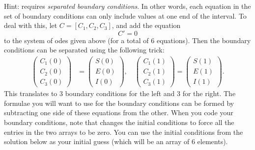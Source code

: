 \begin{problem}
Hint:  requires \emph{separated boundary conditions}.
In other words, each equation in the set of boundary conditions can only include values at one end of the interval.
To deal with this, let $C = [C_1, C_2, C_3]$, and add the equation
\[C' = 0\]
to the system of odes given above (for a total of 6 equations).
Then the boundary conditions can be separated using the following trick:
\begin{align*}
	\begin{pmatrix}C_1(0) \\C_2(0) \\ C_3(0) \end{pmatrix} &= \begin{pmatrix}S(0) \\E(0) \\ I(0) \end{pmatrix}, \quad 	\begin{pmatrix}C_1(1) \\C_2(1) \\ C_3(1) \end{pmatrix} = \begin{pmatrix}S(1) \\E(1) \\ I(1) \end{pmatrix}.
\end{align*}
This translates to 3 boundary conditions for the left and 3 for the right.
The formulae you will want to use for the boundary conditions can be formed by subtracting one side of these equations from the other.
When you code your boundary conditions, note that  changes the initial conditions to force all the entries in the two arrays to be zero.
You can use the initial conditions from the solution below as your initial guess (which will be an array of 6 elements).

\label{prob:sir_measles}
\end{problem} 